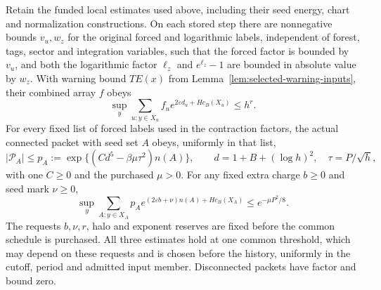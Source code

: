 \begin{proposition}
\label{prop:selected-value-prices}
Retain the funded local estimates used above, including their seed
energy, chart and normalization constructions. On each stored step
there are nonnegative bounds $v_u,w_z$ for the original forced and
logarithmic labels, independent of forest, tags, sector and integration
variables, such that the forced factor is bounded by $v_u$, and both
the logarithmic factor $\ell_z$ and $e^{\ell_z}-1$ are bounded in
absolute value by $w_z$. With warning bound $T E(x)$ from
Lemma~\ref{lem:selected-warning-inputs}, their combined array $f$ obeys
\begin{equation}\label{eq:selected-optional-price}
 \sup_y\sum_{u:y\in X_u}
             f_u e^{2\varepsilon d_u+H c_B(X_u)}\le h^r.
\end{equation}
For every fixed list of forced labels used in the contraction factors,
the actual connected packet with seed set $A$ obeys, uniformly in that
list,
\begin{equation}\label{eq:selected-packet-price}
 |\mathcal P_A|\le p_A:=\exp\{(C d^5-\beta\mu\tau^2)n(A)\},
 \qquad d=1+B+(\log h)^2,\quad\tau=P/\sqrt h,
\end{equation}
with one $C\ge0$ and the purchased $\mu>0$.
For any fixed extra charge $b\ge0$ and seed mark $\nu\ge0$,
\begin{equation}\label{eq:selected-packet-root-price}
 \sup_y\sum_{A:y\in X_A}
 p_A e^{(2\varepsilon b+\nu)n(A)+H c_B(X_A)}
 \le e^{-\mu P^2/8}.
\end{equation}
The requests $b,\nu,r$, halo and exponent reserves are fixed before
the common schedule is purchased. All three estimates hold at one common
threshold, which may depend on these requests and is chosen before the
history, uniformly in the cutoff, period and admitted input member.
Disconnected packets have factor and bound zero.
\end{proposition}

